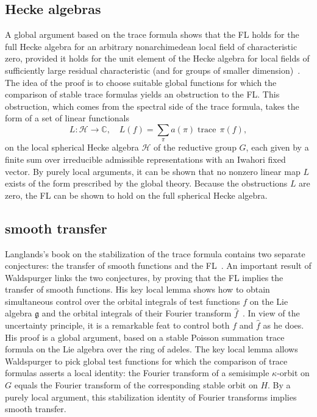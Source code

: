 \documentclass[brochure,english,12pt]{bourbaki}
\theoremstyle{plain}
\def\op#1{{\operatorname{#1}}}
\newcommand{\ring}[1]{\mathbb{#1}}
\def\g{\mathfrak{g}}
\begin{document}
\subsection{Hecke algebras}


 A global argument based on
the trace formula shows that the FL holds for the full
Hecke algebra for an arbitrary nonarchimedean local field of
characteristic zero, provided it holds for the unit element of the
Hecke algebra for local fields of sufficiently large residual
characteristic (and for groups of smaller dimension)~\cite{FLSE}.  
The idea of the proof is to choose suitable global
functions for which the comparison of stable trace formulas yields an
obstruction to the FL.  This obstruction, which comes from the
spectral side of the trace formula, takes the form
of a set of linear functionals  
\[
L:{\mathcal H}\to\ring{C},\quad L(f) = \sum_\pi a(\pi) \op{trace}\,\pi(f),
\]
on the local spherical Hecke
algebra ${\mathcal H}$ of the reductive group $G$, each given by a finite sum over
irreducible admissible representations with an Iwahori fixed vector.
By purely local arguments, it
can be shown that no nonzero linear map $L$ exists of the form
prescribed by the global theory.  
Because the obstructions $L$ are zero,
the FL can be shown to hold on the full spherical Hecke algebra.


\subsection{smooth transfer}

Langlands's book on the stabilization of the trace formula contains
two separate conjectures:  the transfer of smooth
functions  and the FL~\cite{Langlands:debuts}.  An important result
of Waldspurger links the two conjectures, by proving that the
FL implies the transfer of smooth functions.  
His key local lemma shows how to obtain simultaneous control over the
orbital integrals of test functions $f$ on the Lie algebra $\g$ and the orbital integrals of
their Fourier transform $\hat f$~\cite[Prop.~8.2]{Wald:transfert}.  
In view of the uncertainty principle, it is a remarkable feat to
control both $f$ and $\hat f$ as he does.
His proof is a global argument, based on a stable Poisson summation
trace formula on the Lie algebra over the ring of adeles.  The key local lemma allows
Waldspurger to pick global test functions for which the comparison of
trace formulas asserts a local identity: the Fourier transform of a
semisimple $\kappa$-orbit on $G$ equals the Fourier transform of the
corresponding stable orbit on $H$.  By a purely local argument, this
stabilization identity of Fourier transforms  implies smooth transfer.
\end{document}
